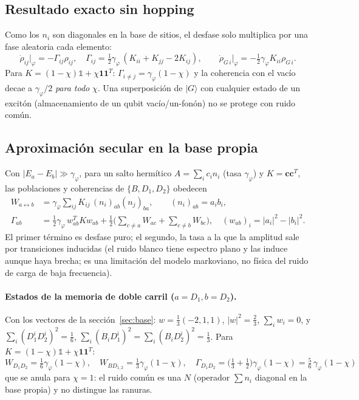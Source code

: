 \documentclass[11pt,a4paper]{article}
\newcommand{\ket}[1]{|#1\rangle}
\newcommand{\gphi}{\gamma_\varphi}
\begin{document}
\subsection{Resultado exacto sin hopping}
Como los $n_i$ son diagonales en la base de sitios, el desfase solo multiplica por una fase aleatoria cada elemento:
\begin{equation}
\dot\rho_{ij}\big|_\varphi=-\Gamma_{ij}\rho_{ij},\quad \Gamma_{ij}=\tfrac12\gphi\,(K_{ii}+K_{jj}-2K_{ij}),\qquad
\dot\rho_{G\,i}\big|_\varphi=-\tfrac12\gphi K_{ii}\rho_{G\,i}.
\end{equation}
Para $K=(1-\chi)\mathbb1+\chi\bm1\bm1^T$: $\Gamma_{i\neq j}=\gphi(1-\chi)$ y la coherencia con el vacío decae a $\gphi/2$ \emph{para todo} $\chi$.
Una superposición de $\ket G$ con cualquier estado de un excitón (almacenamiento de un qubit vacío/un-fonón) no se protege con ruido común.

\subsection{Aproximación secular en la base propia}
Con $|E_a-E_b|\gg\gphi$, para un salto hermítico $A=\sum_i c_in_i$ (tasa $\gphi$) y $K=\bm c\bm c^T$, las poblaciones y coherencias de $\{B,D_1,D_2\}$ obedecen
\begin{align}
W_{a\leftrightarrow b}&=\gphi\sum_{ij}K_{ij}\,(n_i)_{ab}(n_j)_{ba},\qquad (n_i)_{ab}=a_ib_i,\label{eq:W}\\
\Gamma_{ab}&=\tfrac12\gphi\,w^{T}_{ab}Kw_{ab}+\tfrac12\Big(\sum_{c\ne a}W_{ac}+\sum_{c\ne b}W_{bc}\Big),\quad
(w_{ab})_i=|a_i|^2-|b_i|^2 .\label{eq:Gab}
\end{align}
El primer término es desfase puro; el segundo, la tasa a la que la amplitud sale por transiciones inducidas (el ruido blanco tiene espectro plano
y las induce aunque haya brecha; es una limitación del modelo markoviano, no física del ruido de carga de baja frecuencia).

\paragraph{Estados de la memoria de doble carril ($a=D_1,b=D_2$).}
Con los vectores de la sección~\ref{sec:base}: $w=\tfrac13(-2,1,1)$, $|w|^2=\tfrac23$, $\sum_iw_i=0$, y
$\sum_i(D_1^iD_2^i)^2=\tfrac16$, $\sum_i(B_iD_1^i)^2=\sum_i(B_iD_2^i)^2=\tfrac13$. Para $K=(1-\chi)\mathbb1+\chi\bm1\bm1^T$:
\begin{equation}
W_{D_1D_2}=\tfrac16\gphi(1-\chi),\quad W_{BD_{1,2}}=\tfrac13\gphi(1-\chi),\quad
\boxed{\Gamma_{D_1D_2}=\Big(\tfrac13+\tfrac12\Big)\gphi(1-\chi)=\tfrac56\,\gphi(1-\chi)} \label{eq:Gc}
\end{equation}
que se anula para $\chi=1$: el ruido común es una $N$ (operador $\sum n_i$ diagonal en la base propia) y no distingue las ranuras.
\end{document}
